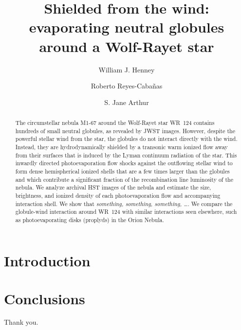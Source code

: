 \documentclass[twocolumn, times]{aastex631}
\begin{document}
\title{Shielded from the wind: evaporating neutral globules around a Wolf-Rayet star}
\author[0000-0001-6208-9109]{William J. Henney}

\author[0000-0000-0000-0000]{Roberto Reyes-Cabañas}

\author[0000-0002-5456-4472]{S. Jane Arthur}


\begin{abstract}
  The circumstellar nebula M1-67 around the Wolf-Rayet star WR~124
  contains hundreds of small neutral globules, as revealed by JWST images.
  However, despite the powerful stellar wind from the star, the globules
  do not interact directly with the wind.
  Instead, they are hydrodynamically shielded by a transonic warm ionized
  flow away from their surfaces that is induced by the Lyman continuum radiation
  of the star.
  This inwardly directed photoevaporation flow shocks against the
  outflowing stellar wind to form dense hemispherical ionized shells
  that are a few times larger than the globules
  and which contribute a significant fraction of the recombination line luminosity
  of the nebula.
  We analyze archival HST images of the nebula and estimate the size, brightness,
  and ionized density of each photoevaporation flow and accompanying interaction shell.
  We show that \textit{something, something, something, \dots}.
  We compare the globule-wind interaction around WR~124 with similar interactions
  seen elsewhere, such as photoevaporating disks (proplyds) in the Orion Nebula.
\end{abstract}



\section{Introduction}
\label{sec:introduction}

\section{Conclusions}
\label{sec:conclusions}

\begin{acknowledgments}
  Thank you.
\end{acknowledgments}



\end{document}
